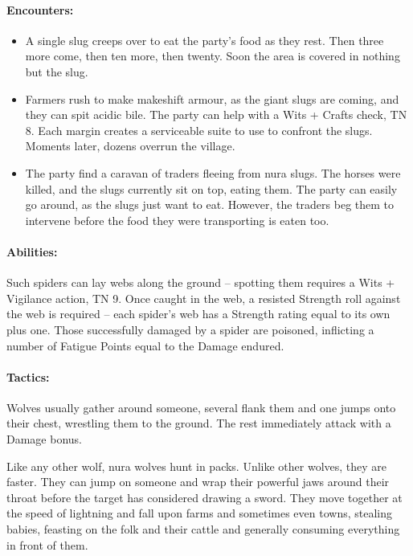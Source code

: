 \begin{multicols}{2}
\begin{boxtext}
\end{boxtext}

\paragraph{Encounters:}

\begin{itemize}

  \item
  A single slug creeps over to eat the party's food as they rest.
  Then three more come, then ten more, then twenty.
  Soon the area is covered in nothing but the slug.
  \item
  Farmers rush to make makeshift armour, as the giant slugs are coming, and they can spit acidic bile.
  The party can help with a Wits + Crafts check, TN 8.
  Each margin creates a serviceable suite to use to confront the slugs.
  Moments later, dozens overrun the village.
  \item
  The party find a caravan of traders fleeing from nura slugs.
  The horses were killed, and the slugs currently sit on top, eating them.
  The party can easily go around, as the slugs just want to eat.
  However, the traders beg them to intervene before the food they were transporting is eaten too.

\end{itemize}

\nuraspider

\paragraph{Abilities:} Such spiders can lay webs along the ground -- spotting them requires a Wits + Vigilance action, TN 9.
Once caught in the web, a resisted Strength roll against the web is required -- each spider's web has a Strength rating equal to its own plus one.
Those successfully damaged by a spider are poisoned, inflicting a number of Fatigue Points equal to the Damage endured.

\label{nura_wolf}

\paragraph{Tactics:} Wolves usually gather around someone, several flank them and one jumps onto their chest, wrestling them to the ground.
The rest immediately attack with a Damage bonus.

Like any other wolf, nura wolves hunt in packs.
Unlike other wolves, they are faster.
They can jump on someone and wrap their powerful jaws around their throat before the target has considered drawing a sword.
They move together at the speed of lightning and fall upon farms and sometimes even towns, stealing babies, feasting on the folk and their cattle and generally consuming everything in front of them.


\end{multicols}

